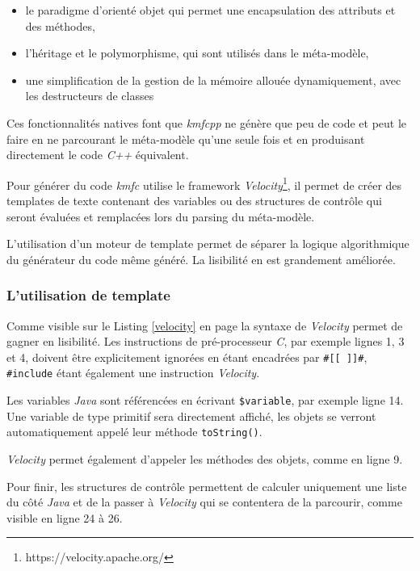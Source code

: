 \begin{itemize}
\item le paradigme d'orienté objet qui permet une encapsulation des attributs et des méthodes,
\item l'héritage et le polymorphisme, qui sont utilisés dans le méta-modèle,
\item une simplification de la gestion de la mémoire allouée dynamiquement, avec les destructeurs de classes
\end{itemize}

Ces fonctionnalités natives font que \emph{kmfcpp} ne génère que peu de code et peut le faire en ne parcourant le méta-modèle qu'une seule fois et en produisant directement le code \emph{C++} équivalent.

Pour générer du code \emph{kmfc} utilise le framework \emph{Velocity}\footnote{https://velocity.apache.org/}, il permet de créer des templates de texte contenant des variables ou des structures de contrôle qui seront évaluées et remplacées lors du parsing du méta-modèle.

L'utilisation d'un moteur de template permet de séparer la logique algorithmique du générateur du code même généré. La lisibilité en est grandement améliorée.

\subsubsection{L'utilisation de template}

Comme visible sur le Listing \ref{velocity} en page \pageref{velocity} la syntaxe de \emph{Velocity} permet de gagner en lisibilité. Les instructions de pré-processeur \emph{C}, par exemple lignes 1, 3 et 4, doivent être explicitement ignorées en étant encadrées par \texttt{\#[[ ]]\#}, \texttt{\#include} étant également une instruction \emph{Velocity}.

Les variables \emph{Java} sont référencées en écrivant \texttt{\$variable}, par exemple ligne 14. Une variable de type primitif sera directement affiché, les objets se verront automatiquement appelé leur méthode \texttt{toString()}.

\emph{Velocity} permet également d'appeler les méthodes des objets, comme en ligne 9.

Pour finir, les structures de contrôle permettent de calculer uniquement une liste du côté \emph{Java} et de la passer à \emph{Velocity} qui se contentera de la parcourir, comme visible en ligne 24 à 26.



